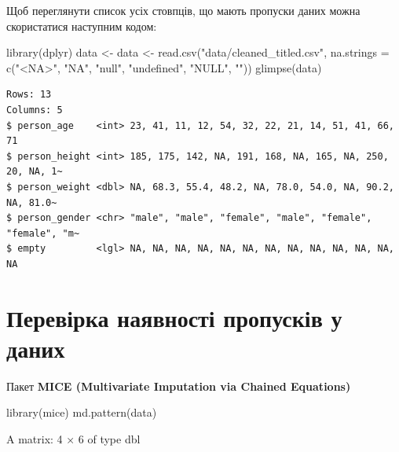 \documentclass[
  letterpaper,
  DIV=11,
  numbers=noendperiod]{scrreprt}
\newenvironment{Shaded}{\begin{snugshade}}{\end{snugshade}}
\newcommand{\AttributeTok}[1]{\textcolor[rgb]{0.40,0.45,0.13}{#1}}
\newcommand{\FunctionTok}[1]{\textcolor[rgb]{0.28,0.35,0.67}{#1}}
\newcommand{\NormalTok}[1]{\textcolor[rgb]{0.00,0.23,0.31}{#1}}
\newcommand{\OtherTok}[1]{\textcolor[rgb]{0.00,0.23,0.31}{#1}}
\newcommand{\StringTok}[1]{\textcolor[rgb]{0.13,0.47,0.30}{#1}}
\begin{document}
Щоб переглянути список усіх стовпців, що мають пропуски даних можна
скористатися наступним кодом:

\begin{Shaded}
\begin{Highlighting}[]
\FunctionTok{library}\NormalTok{(dplyr)}
\NormalTok{data }\OtherTok{\textless{}{-}}\NormalTok{ data }\OtherTok{\textless{}{-}} \FunctionTok{read.csv}\NormalTok{(}\StringTok{"data/cleaned\_titled.csv"}\NormalTok{, }\AttributeTok{na.strings =} \FunctionTok{c}\NormalTok{(}\StringTok{"\textless{}NA\textgreater{}"}\NormalTok{, }\StringTok{"NA"}\NormalTok{, }\StringTok{"null"}\NormalTok{, }\StringTok{"undefined"}\NormalTok{, }\StringTok{"NULL"}\NormalTok{, }\StringTok{""}\NormalTok{))}
\FunctionTok{glimpse}\NormalTok{(data)}
\end{Highlighting}
\end{Shaded}

\begin{verbatim}
Rows: 13
Columns: 5
$ person_age    <int> 23, 41, 11, 12, 54, 32, 22, 21, 14, 51, 41, 66, 71
$ person_height <int> 185, 175, 142, NA, 191, 168, NA, 165, NA, 250, 20, NA, 1~
$ person_weight <dbl> NA, 68.3, 55.4, 48.2, NA, 78.0, 54.0, NA, 90.2, NA, 81.0~
$ person_gender <chr> "male", "male", "female", "male", "female", "female", "m~
$ empty         <lgl> NA, NA, NA, NA, NA, NA, NA, NA, NA, NA, NA, NA, NA
\end{verbatim}

\section{Перевірка наявності пропусків у
даних}\label{ux43fux435ux440ux435ux432ux456ux440ux43aux430-ux43dux430ux44fux432ux43dux43eux441ux442ux456-ux43fux440ux43eux43fux443ux441ux43aux456ux432-ux443-ux434ux430ux43dux438ux445}

Пакет \textbf{MICE (Multivariate Imputation via Chained Equations)}

\begin{Shaded}
\begin{Highlighting}[]
\FunctionTok{library}\NormalTok{(mice)}
\FunctionTok{md.pattern}\NormalTok{(data)}
\end{Highlighting}
\end{Shaded}

A matrix: 4 × 6 of type dbl
\end{document}
